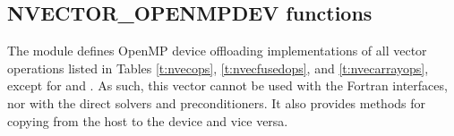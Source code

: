 \subsection{NVECTOR\_OPENMPDEV functions}
\label{ss:nvec_openmpdev_functions}

The {\nvecopenmpdev} module defines OpenMP device offloading implementations of
all vector operations listed in Tables \ref{t:nvecops}, \ref{t:nvecfusedops},
and \ref{t:nvecarrayops}, except for  and
. As such, this vector cannot be used with the
{\sundials} Fortran interfaces, nor with the {\sundials} direct solvers and
preconditioners. It also provides methods for copying from the host to
the device and vice versa.

